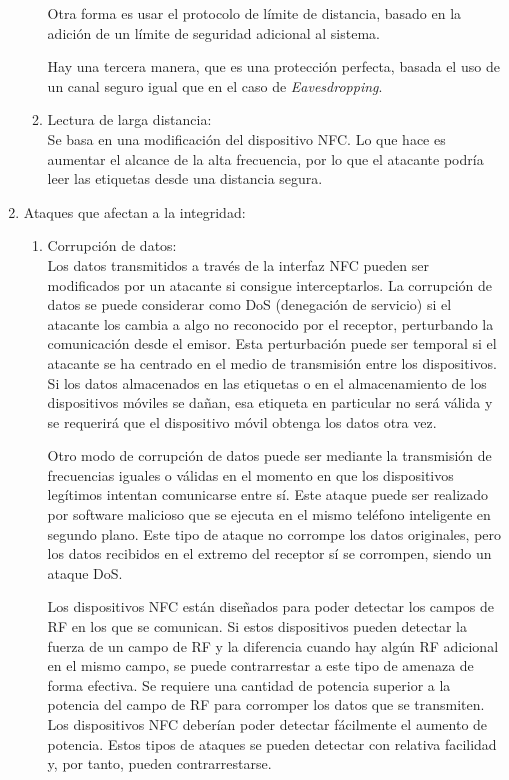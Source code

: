 \documentclass[12pt,a4paper,onecolumn,oneside]{report}
\begin{document}
\begin{enumerate}
\begin{enumerate}
Otra forma es usar el protocolo de límite de distancia, basado en la adición de un límite de seguridad adicional al sistema. 

Hay una tercera manera, que es una protección perfecta, basada el uso de un canal seguro igual que en el caso de \textit{Eavesdropping}.

\item Lectura de larga distancia:\\
Se basa en una modificación del dispositivo NFC. Lo que hace es aumentar el alcance de la alta frecuencia, por lo que el atacante podría leer las etiquetas desde una distancia segura.

\end{enumerate}

\item Ataques que afectan a la integridad:\\
\begin{enumerate}

\item Corrupción de datos:\\
Los datos transmitidos a través de la interfaz NFC pueden ser modificados por un atacante si consigue interceptarlos. La corrupción de datos se puede considerar como DoS (denegación de servicio) si el atacante los cambia a algo no reconocido por el receptor, perturbando la comunicación desde el emisor. Esta perturbación puede ser temporal si el atacante se ha centrado en el medio de transmisión entre los dispositivos. Si los datos almacenados en las etiquetas o en el almacenamiento de los dispositivos móviles se dañan, esa etiqueta en particular no será válida y se requerirá que el dispositivo móvil obtenga los datos otra vez.

Otro modo de corrupción de datos puede ser mediante la transmisión de frecuencias iguales o válidas en el momento en que los dispositivos legítimos intentan comunicarse entre sí. Este ataque puede ser realizado por software malicioso que se ejecuta en el mismo teléfono inteligente en segundo plano. Este tipo de ataque no corrompe los datos originales, pero los datos recibidos en el extremo del receptor sí se corrompen, siendo un ataque DoS. 

Los dispositivos NFC están diseñados para poder detectar los campos de RF en los que se comunican. Si estos dispositivos pueden detectar la fuerza de un campo de RF y la diferencia cuando hay algún RF adicional en el mismo campo, se puede contrarrestar a este tipo de amenaza de forma efectiva. Se requiere una cantidad de potencia superior a la potencia del campo de RF para corromper los datos que se transmiten. Los dispositivos NFC deberían poder detectar fácilmente el aumento de potencia. Estos tipos de ataques se pueden detectar con relativa facilidad y, por tanto, pueden contrarrestarse.


\end{enumerate}
\end{enumerate}
\end{document}
